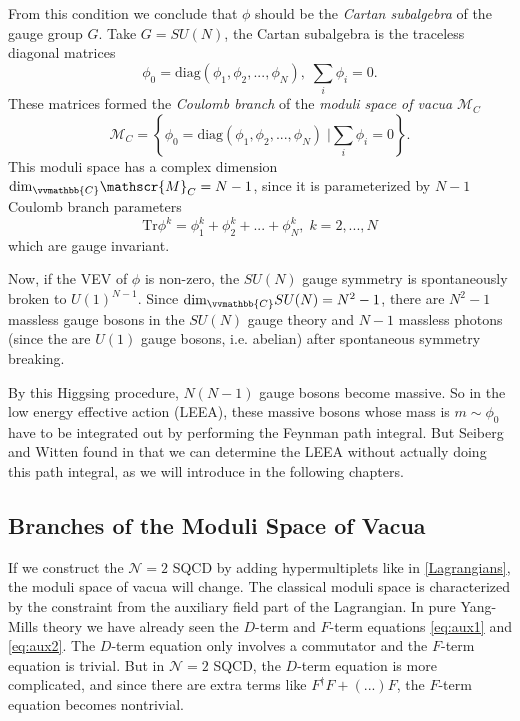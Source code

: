 \documentclass{article}
\begin{document}
From this condition we conclude that $\phi$ should be the \textit{Cartan subalgebra} of the gauge group $G$. Take $G=SU(N)$, the Cartan subalgebra is the traceless diagonal matrices
\begin{equation}
    \phi_0=\mathrm{diag}(\phi_1,\phi_2,...,\phi_N),\;\sum_i \phi_i=0.
\end{equation}
These matrices formed the \textit{Coulomb branch} of the \textit{moduli space of vacua} $\mathscr{M}_C$
\begin{equation}
    \mathscr{M}_C=\left\{\phi_0=\mathrm{diag}(\phi_1,\phi_2,...,\phi_N)\;|\sum_i \phi_i=0\right\}.
\end{equation}
This moduli space has a complex dimension $\mathrm{dim}_{\vvmathbb{C}}\mathscr{M}_C=N-1$, since it is parameterized by $N-1$ Coulomb branch parameters
\begin{equation}
\label{eq:ginv}
    \mathrm{Tr}\phi^k=\phi_1^k+\phi_2^k+...+\phi_N^k,\;k=2,...,N
\end{equation}
which are gauge invariant.

Now, if the VEV of $\phi$ is non-zero, the $SU(N)$ gauge symmetry is spontaneously broken to $U(1)^{N-1}$. Since $\mathrm{dim}_{\vvmathbb{C}}SU(N)=N^2-1$, there are $N^2-1$ massless gauge bosons in the $SU(N)$ gauge theory and $N-1$ massless photons (since the are $U(1)$ gauge bosons, i.e. abelian) after spontaneous symmetry breaking. 

By this Higgsing procedure, $N(N-1)$ gauge bosons become massive. So in the low energy effective action (LEEA), these massive bosons whose mass is $m\sim \phi_0$ have to be integrated out by performing the Feynman path integral. But Seiberg and Witten found in \cite{Sei94} that we can determine the LEEA without actually doing this path integral, as we will introduce in the following chapters.

\subsection{Branches of the Moduli Space of Vacua}
If we construct the $\mathcal{N}=2$ SQCD by adding hypermultiplets like in \ref{Lagrangians}, the moduli space of vacua will change. The classical moduli space is characterized by the constraint from the auxiliary field part of the Lagrangian. In pure Yang-Mills theory we have already seen the $D$-term and $F$-term equations \eqref{eq:aux1} and \eqref{eq:aux2}. The $D$-term equation only involves a commutator and the $F$-term equation is trivial. But in $\mathcal{N}=2$ SQCD, the $D$-term equation is more complicated, and since there are extra terms like $F^{\dagger}F+(...)F$, the $F$-term equation becomes nontrivial.
\end{document}
